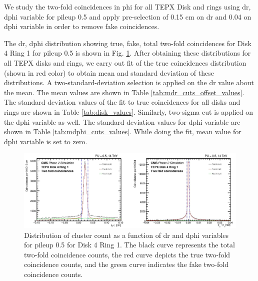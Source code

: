 We study the two-fold coincidences in phi for all TEPX Disk and rings using dr, dphi variable for pileup 0.5 and apply pre-selection of 0.15 cm on dr and 0.04 on dphi variable in order to remove fake coincidences. 

The dr, dphi distribution showing true, fake, total two-fold coincidences for Disk 4 Ring 1 for pileup 0.5 is shown in Fig. \ref{fig:cluster_dr_dphi_dist}. After obtaining these distributions for all TEPX disks and rings, we carry out fit of the true coincidences distribution (shown in red color) to obtain mean and standard deviation of these distributions. A two-standard-deviation selection is applied on the dr value about the mean. The mean values are shown in Table \ref{tab:mdr_cuts_offset_values}. The  standard deviation values of the fit to true coincidences for all disks and rings are shown in Table \ref{tab:disk_values}. %
Similarly, two-sigma cut is applied on the dphi variable as well. The standard deviation values for dphi variable are shown in Table \ref{tab:mdphi_cuts_values}. While doing the fit, mean value for dphi variable is set to zero. %

\begin{figure}[H]
\centering
\includegraphics[width=1\textwidth]{ashish_thesis/D4R1_S2_drdphi_cut_1.png}
\caption[Pileup 0.5 Cluster Count in D4R1 vs. dr & dphi]{%
  Distribution of cluster count as a function of dr and dphi variables for pileup 0.5 for Disk 4 Ring 1. The black curve represents the total two-fold coincidence counts, the red curve depicts the true two-fold coincidence counts, and the green curve indicates the fake two-fold coincidence counts.
}
\label{fig:cluster_dr_dphi_dist}
\end{figure}


